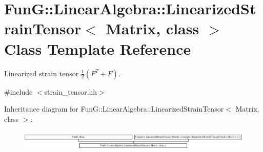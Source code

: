 \hypertarget{classFunG_1_1LinearAlgebra_1_1LinearizedStrainTensor}{\section{Fun\-G\-:\-:Linear\-Algebra\-:\-:Linearized\-Strain\-Tensor$<$ Matrix, class $>$ Class Template Reference}
\label{classFunG_1_1LinearAlgebra_1_1LinearizedStrainTensor}
}


Linearized strain tensor $ \frac{1}{2}\left(F^T+F\right) $.  




{\ttfamily \#include $<$strain\-\_\-tensor.\-hh$>$}

Inheritance diagram for Fun\-G\-:\-:Linear\-Algebra\-:\-:Linearized\-Strain\-Tensor$<$ Matrix, class $>$\-:\begin{figure}[H]
\begin{center}
\leavevmode
\includegraphics[height=0.962199cm]{classFunG_1_1LinearAlgebra_1_1LinearizedStrainTensor}
\end{center}
\end{figure}
